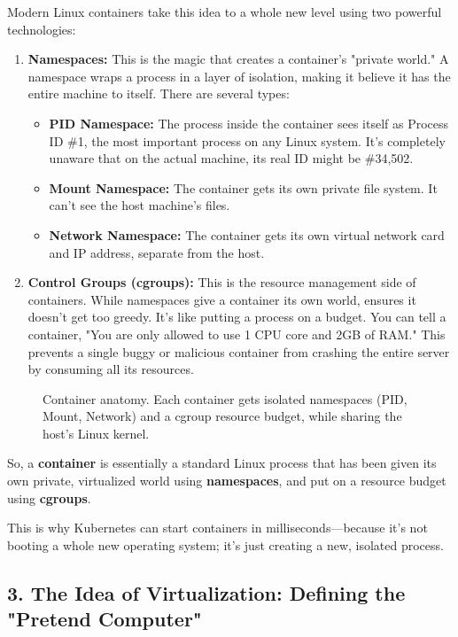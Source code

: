Modern Linux containers take this idea to a whole new level using two powerful technologies:

\begin{enumerate}
\item \textbf{Namespaces:} This is the magic that creates a container's "private world." A namespace wraps a process in a layer of isolation, making it believe it has the entire machine to itself. There are several types:
\begin{itemize}
\item \textbf{PID Namespace:} The process inside the container sees itself as Process ID \#1, the most important process on any Linux system. It's completely unaware that on the actual machine, its real ID might be \#34,502.
\item \textbf{Mount Namespace:} The container gets its own private file system. It can't see the host machine's files.
\item \textbf{Network Namespace:} The container gets its own virtual network card and IP address, separate from the host.
\end{itemize}
\item \textbf{Control Groups (cgroups):} This is the resource management side of containers. While namespaces give a container its own world,  ensures it doesn't get too greedy. It's like putting a process on a budget. You can tell a container, "You are only allowed to use 1 CPU core and 2GB of RAM." This prevents a single buggy or malicious container from crashing the entire server by consuming all its resources.
\end{enumerate}
\begin{figure}[htbp]
\centering

\caption{Container anatomy. Each container gets isolated namespaces (PID, Mount, Network) and a cgroup resource budget, while sharing the host's Linux kernel.}
\label{fig:1_3}
\end{figure}



So, a \textbf{container} is essentially a standard Linux process that has been given its own private, virtualized world using \textbf{namespaces}, and put on a resource budget using \textbf{cgroups}.

This is why Kubernetes can start containers in milliseconds---because it's not booting a whole new operating system; it's just creating a new, isolated process.


\subsection{3. The Idea of Virtualization: Defining the "Pretend Computer"}



